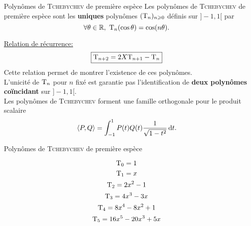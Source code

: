 \begin{box_titre}{Polynômes de \textsc{Tchebychev} de première espèce}
    Les polynômes de \textsc{Tchebychev} de première espèce sont les \textbf{uniques} polynômes $(\mathrm{T}_n)_{n \geqslant 0}$ définis sur $]-1, 1[$ par
    $$\forall \theta \in \mathbb{R},\ \mathrm{T}_n (\cos \theta) = \cos(n \theta).$$
\end{box_titre}

\underline{Relation de récurrence:}
$$\boxed{\mathrm{T}_{n+2} = 2X \mathrm{T}_{n+1} - \mathrm{T}_n}$$
Cette relation permet de montrer l'existence de ces polynômes. \\
L'unicité de $\mathrm{T}_n$ pour $n$ fixé est garantie pas l'identification de \textbf{deux polynômes coïncidant} sur $]-1, 1[$. \\
Les polynômes de \textsc{Tchebychev} forment une famille orthogonale pour le produit scalaire
$$\langle P, Q \rangle = \int_{-1}^{1} P(t) Q(t) \frac{1}{\sqrt{1-t^2}} \, \mathrm{d} t.$$

\begin{marginfigure}[-8.5cm]
    \centering
	
	\caption*{\centering Polynômes de \textsc{Tchebychev} de première espèce}
	{\small
	\color{blue} $$\mathrm{T}_0 = 1$$
	\color{red} $$\mathrm{T}_1 = x$$
	\color{green} $$\mathrm{T}_2 = 2x^2-1$$
	\color{purple} $$\mathrm{T}_3 = 4x^3-3x$$
	\color{black} $$\mathrm{T}_4 = 8x^4-8x^2+1$$
	\color{orange} $$\mathrm{T}_5 = 16x^5-20x^3+5x$$
	}
\end{marginfigure}
